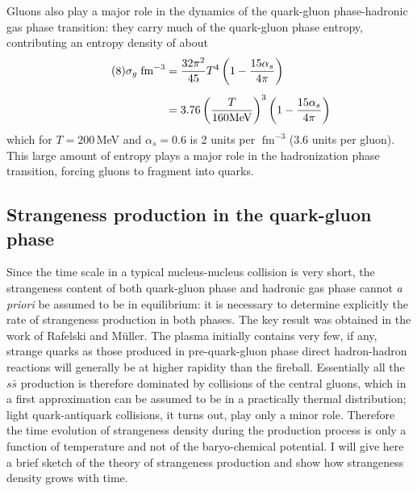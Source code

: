 \begin{mdframed}[linecolor=gray,roundcorner=12pt,backgroundcolor=Dandelion!15,linewidth=1pt,leftmargin=0cm,rightmargin=0cm,topline=true,bottomline=true,skipabove=12pt]
Gluons also play a major role in the dynamics of the quark-gluon phase-hadronic gas phase transition: they carry much of the quark-gluon phase entropy, contributing an entropy density of about 
\begin{align*}\label{eq:fi} 
\tag{8}\sigma_g \;\mbox{fm}^{-3} 
&=  {32\pi^2\over 45} T^4
   \left( 1 - {15\alpha_s\over 4\pi} \right)
\ms{5}
\\
&=  3.76 \left( {T\over 160 \mbox{MeV}} \right)^{3} 
    \left( 1 -{15\alpha_s\over 4\pi} \right)
\notag
\end{align*}
which for $T = 200$\,MeV and $\alpha_s = 0.6$ is 2 units per $\;\mbox{fm}^{-3}$ (3.6 units per gluon). This large amount of entropy plays a major role in the hadronization phase transition, forcing gluons to fragment into quarks.

\subsection*{Strangeness production in the quark-gluon phase}

Since the time scale in a typical nucleus-nucleus collision is very short, the strangeness content of both quark-gluon phase and hadronic gas phase cannot {\em a priori} be assumed to be in equilibrium: it is necessary to determine explicitly the rate of strangeness production in both phases. The key result was obtained in the work of Rafelski and M\"uller\footnotemark[3]. The plasma initially contains very few, if any, strange quarks as those produced in pre-quark-gluon phase direct hadron-hadron reactions will generally be at higher rapidity than the fireball. Essentially all the $s\bar s$ production is therefore dominated by collisions of the central gluons, which in a first approximation can be assumed to be in a practically thermal distribution; light quark-antiquark collisions, it turns out, play only a minor role. Therefore the time evolution of strangeness density during the production process is only a function of temperature and not of the baryo-chemical potential. I will give here a brief sketch of the theory of strangeness production and show how strangeness density grows with time.  




\end{mdframed}
